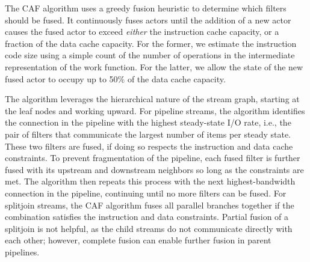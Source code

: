 \documentclass{sigplanconf}
\begin{document}
The CAF algorithm uses a greedy fusion heuristic to determine which
filters should be fused. It continuously fuses actors until the
addition of a new actor causes the fused actor to exceed {\it either}
the instruction cache capacity, or a fraction of the data cache
capacity.  For the former, we estimate the instruction code size using
a simple count of the number of operations in the intermediate
representation of the work function.  For the latter, we allow the
state of the new fused actor to occupy up to 50\% of the data cache
capacity.

The algorithm leverages the hierarchical nature of the stream graph,
starting at the leaf nodes and working upward.  For pipeline streams,
the algorithm identifies the connection in the pipeline with the
highest steady-state I/O rate, i.e., the pair of filters that
communicate the largest number of items per steady state.  These two filters
are fused, if doing so respects the instruction and data cache constraints.
To prevent fragmentation of the pipeline, each fused filter is further
fused with its upstream and downstream neighbors so long as the
constraints are met.  The algorithm then repeats this process with the
next highest-bandwidth connection in the pipeline, continuing until no
more filters can be fused.  For splitjoin streams, the CAF algorithm
fuses all parallel branches together if the combination satisfies the
instruction and data constraints.  Partial fusion of a splitjoin is
not helpful, as the child streams do not communicate directly with
each other; however, complete fusion can enable further fusion in
parent pipelines.




\end{document}

